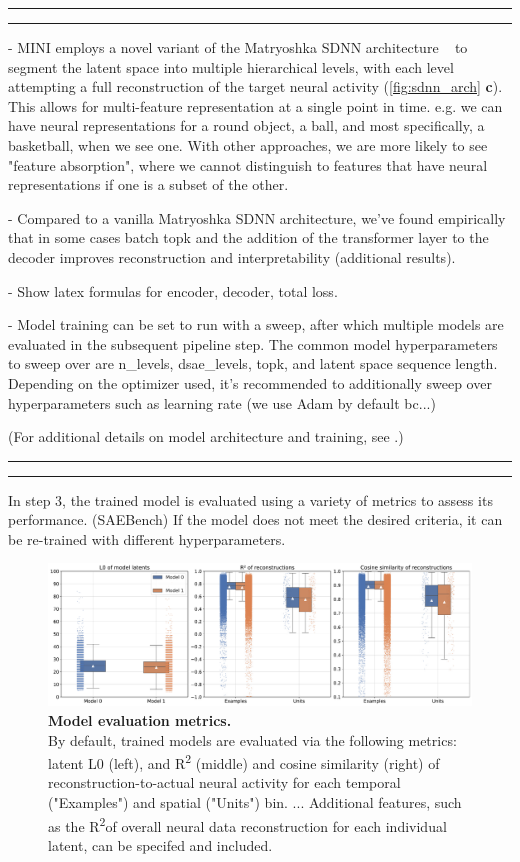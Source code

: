 \hrule
\hrule

- MINI employs a novel variant of the Matryoshka SDNN architecture ~\cite{bussmann_2025_msae} to segment the latent space into multiple hierarchical levels, with each level attempting a full reconstruction of the target neural activity (\autoref{fig:sdnn_arch} \textbf{c}). This allows for multi-feature representation at a single point in time. e.g. we can have neural representations for a round object, a ball, and most specifically, a basketball, when we see one. With other approaches, we are more likely to see "feature absorption", where we cannot distinguish to features that have neural representations if one is a subset of the other.

- Compared to a vanilla Matryoshka SDNN architecture, we've found empirically that in some cases batch topk and the addition of the transformer layer to the decoder improves reconstruction and interpretability (additional results).

- Show latex formulas for encoder, decoder, total loss.

- Model training can be set to run with a sweep, after which multiple models are evaluated in the subsequent pipeline step. The common model hyperparameters to sweep over are n\_levels, dsae\_levels, topk, and latent space sequence length. Depending on the optimizer used, it's recommended to additionally sweep over hyperparameters such as learning rate (we use Adam by default bc...)

(For additional details on model architecture and training, see .)

\hrule
\hrule
In step 3, the trained model is evaluated using a variety of metrics to assess its performance. (SAEBench) If the model does not meet the desired criteria, it can be re-trained with different hyperparameters. 

\begin{figure}[h]
    \centering
    \includegraphics[width=\linewidth]{figures/model_eval.pdf}
    \caption{
        \textbf{Model evaluation metrics.} \\
        \small By default, trained models are evaluated via the following metrics: latent L0 (left), and R\textsuperscript{2} (middle) and cosine similarity (right) of reconstruction-to-actual neural activity for each temporal ("Examples") and spatial ("Units") bin. ... Additional features, such as the R\textsuperscript{2}of overall neural data reconstruction for each individual latent, can be specifed and included.
    }
    \label{fig:model_eval}
\end{figure}

